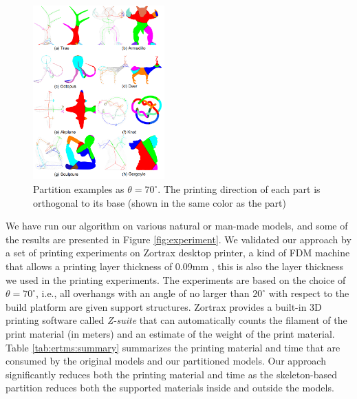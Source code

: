 \begin{figure}[tbp]
  \centering
  \includegraphics[width=0.45\textwidth]{figs/programming.png}
  \caption{\label{fig:programming}%
           Partition examples as $\theta = 70^{\circ}$. The printing direction of each part is orthogonal to its base (shown in the same color as the part)}
\end{figure}
We have run our algorithm on various natural or man-made models, and some of the results are presented in Figure \ref{fig:experiment}. We validated our approach by a set of printing experiments on Zortrax desktop printer, a kind of FDM machine that allows a printing layer thickness of 0.09mm , this is also the layer thickness we used in the printing experiments. The experiments are based on the choice of $\theta = 70^{\circ}$, i.e., all overhangs with an angle of no larger than $20^{\circ}$ with respect to the build platform are given support structures. Zortrax provides a built-in 3D printing software called \emph{Z-suite} that can automatically counts the filament of the print material (in meters) and an estimate of the weight of the print material. Table \ref{tab:ertms:summary} summarizes the printing material and time that are consumed by the original models and our partitioned models. Our approach significantly reduces both the printing material and time as the skeleton-based partition reduces both the supported materials inside and outside the models.


